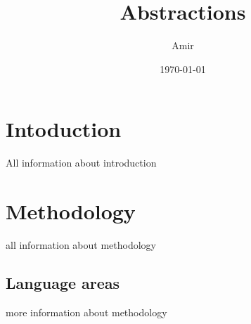 \documentclass{article}
\title{Abstractions}
\author{Amir}
\date{\today}
\begin{document}
\maketitle
\section{Intoduction}
All information about introduction
\section{Methodology} 
all information about methodology
\subsection{Language areas}
more information about methodology
\end{document}
